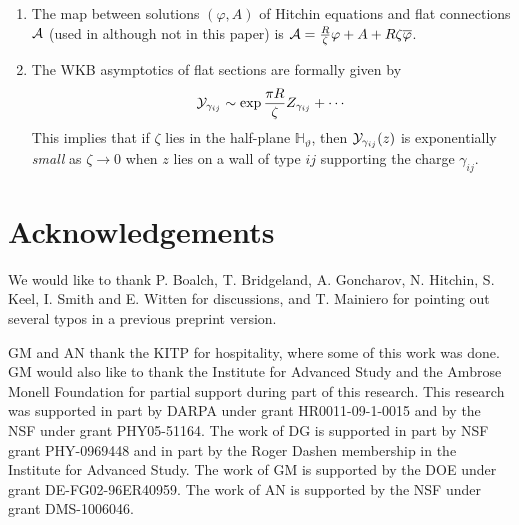 \documentclass[11pt,a4paper]{article}
\def\IH{\mathbb{H}}
\def\CY {{\cal Y}}
\def\CA{{\cal A}}
\def\CY {{\cal Y}}
\def\CA{{\cal A}}
\begin{document}
\begin{enumerate}
\item The map between solutions $(\varphi, A)$ of Hitchin equations
and flat connections $\CA$ (used in
 \cite{Gaiotto:2008cd,Gaiotto:2009hg,Gaiotto:2010be,Gaiotto:2011tf} although not in this paper)
is $\CA = \frac{R}{\zeta}\varphi + A + R \zeta \overline{\varphi}$.

\item The WKB asymptotics of flat sections are formally given by
\begin{equation}
\CY_{\gamma_{ij}} \sim \exp \frac{ \pi R}{\zeta} Z_{\gamma_{ij}} + \cdots
\end{equation}
This implies that if $\zeta$ lies in the half-plane $\IH_{\vartheta}$,
then $\CY_{\gamma_{ij}}(z)$ is exponentially \emph{small} as $\zeta \to 0$
when $z$ lies on a wall of type $ij$ supporting the charge $\gamma_{ij}.$

\end{enumerate}




\section*{Acknowledgements}

We would like to thank P. Boalch, T. Bridgeland, A. Goncharov, N. Hitchin, S. Keel, I. Smith and E. Witten for discussions, and T. Mainiero for pointing out several typos in a previous preprint version.

GM and AN thank the KITP for hospitality, where
some of this work was done. GM would also like to
thank the Institute for Advanced Study and the Ambrose Monell
Foundation for partial support during part of this research.
This research was supported in part by DARPA under grant
HR0011-09-1-0015 and by the NSF under grant PHY05-51164.
The work of DG is supported in part by NSF grant PHY-0969448 and in part
by the Roger Dashen membership in the Institute for Advanced Study.
The work of GM is supported by the DOE under grant
DE-FG02-96ER40959. The work of AN is supported by
the NSF under grant DMS-1006046.




\end{document}
